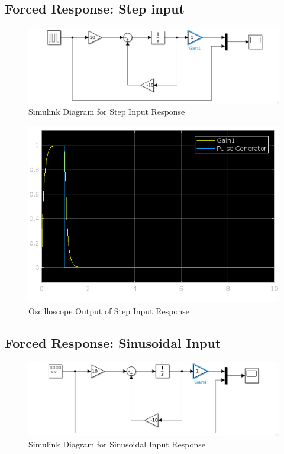 \documentclass[12pt]{article}
\begin{document}
		\subsection{Forced Response: Step input}
			\begin{figure}[H]
				\centering
				\includegraphics[width=1\linewidth]{"Code/Fig/part2_2_slx.png"} %
				\caption{Simulink Diagram for Step Input Response}
				\label{fig:slx_step_input_diagram}
			\end{figure}	
			\begin{figure}[H]
				\centering
				\includegraphics[width=1\linewidth]{"Code/Fig/step_input_output.png"} 
				\caption{Oscilloscope Output of Step Input Response}
				\label{fig:slx_step_input_output}
			\end{figure}
			
		\subsection{Forced Response: Sinusoidal Input}
			\begin{figure}[H]
				\centering
				\includegraphics[width=1\linewidth]{"Code/Fig/part2_3_slx.png"} %
				\caption{Simulink Diagram for Sinusoidal Input Response}
				\label{fig:slx_sine_input_diagram}
			\end{figure}
		
\end{document}
